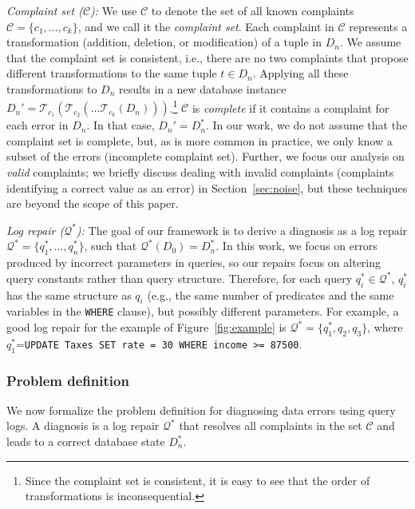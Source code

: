 \smallskip
\noindent
\emph{Complaint set ($\mathcal{C}$):}
We use $\mathcal{C}$ to denote the set of all known complaints
$\mathcal{C}=\{c_1,\dots,c_k\}$, and we call it the \emph{complaint set}.
Each complaint in $\mathcal{C}$ represents a transformation (addition,
deletion, or modification) of a tuple in $D_n$. We assume that the
complaint set is consistent, i.e., there are no two complaints that
propose different transformations to the same tuple $t\in D_n$.
Applying all these transformations to $D_n$ results in a new database
instance
$D_n'=\mathcal{T}_{c_1}(\mathcal{T}_{c_2}(\dots\mathcal{T}_{c_k}(D_n)))$.\footnote{Since
the complaint set is consistent, it is easy to see that the order of
transformations is inconsequential.} $\mathcal{C}$ is \emph{complete}
if it contains a complaint for each error in $D_n$. In that case,
$D_n'=D_n^*$. In our work, we do not assume that the complaint set is
complete, but, as is more common in practice, we only know a subset of
the errors (incomplete complaint set). Further, we focus our analysis
on \emph{valid} complaints; we briefly discuss dealing with invalid
complaints (complaints identifying a correct value as an error) in
Section~\ref{sec:noise}, but these techniques are beyond the scope of this paper.

\smallskip
\noindent
\emph{Log repair ($\mathcal{Q}^*$):}
The goal of our framework is to derive a diagnosis as a log repair
$\mathcal{Q}^*=\{q_1^*,\dots, q_n^*\}$, such that
$\mathcal{Q}^*(D_0)=D_n^*$. In this work, we focus on errors produced
by incorrect parameters in queries, so our repairs focus on altering
query constants rather than query structure. Therefore, for each query
$q_i^*\in\mathcal{Q}^*$, $q_i^*$ has the same structure as $q_i$
(e.g., the same number of predicates and the same variables in the \texttt{WHERE} clause), 
but possibly different parameters. For example, a good log repair for the
example of Figure~\ref{fig:example} is
$\mathcal{Q}^*=\{q_1^*,q_2,q_3\}$, where $q_1^*$=\texttt{UPDATE Taxes
SET rate = 30 WHERE income >= 87500}.


\subsubsection*{Problem definition}

We now formalize the problem definition for diagnosing data
errors using query logs. A diagnosis is a log repair
$\mathcal{Q}^*$ that resolves all complaints in the set $\mathcal{C}$
and leads to a correct database state $D_n^*$.


